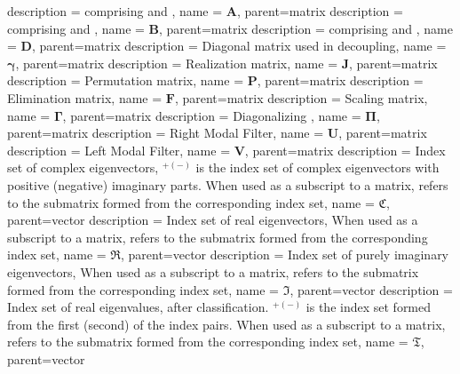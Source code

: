 {
	description = { comprising  and }, 
	name = {\ensuremath{\mathbf{A}}},
	parent=matrix
}
{
	description = { comprising  and }, 
	name = {\ensuremath{\mathbf{B}}},
	parent=matrix
}
{
	description = { comprising  and }, 
	name = {\ensuremath{\mathbf{D}}},
	parent=matrix
}
{
	description = {Diagonal matrix used in decoupling}, 
	name = {\ensuremath{\mathbf{\gamma}}},
	parent=matrix
}
{
	description = {Realization matrix}, 
	name = {\ensuremath{\mathbf{J}}},
	parent=matrix
}
{
	description = {Permutation matrix}, 
	name = {\ensuremath{\mathbf{P}}},
	parent=matrix
}
{
	description = {Elimination matrix}, 
	name = {\ensuremath{\mathbf{F}}},
	parent=matrix
}
{
	description = {Scaling matrix}, 
	name = {\ensuremath{\mathbf{\Gamma}}},
	parent=matrix
}
{
	description = {Diagonalizing }, 
	name = {\ensuremath{\mathbf{\Pi}}},
	parent=matrix
}
{
	description = {Right Modal Filter}, 
	name = {\ensuremath{\mathbf{U}}},
	parent=matrix
}
{
	description = {Left Modal Filter}, 
	name = {\ensuremath{\mathbf{V}}},
	parent=matrix
}
{
	description = {Index set of complex eigenvectors, 
	\ensuremath{^{+(-)}} is the index set of complex eigenvectors with 
	positive (negative) imaginary parts. When used as a subscript to a matrix, refers 
	to the submatrix formed from the corresponding index set}, 
	name = {\ensuremath{\mathfrak{C}}},
	parent=vector
}
{
	description = {Index set of real eigenvectors,
	When used as a subscript to a matrix, refers to the submatrix formed from 
	the corresponding index set}, 
	name = {\ensuremath{\mathfrak{R}}},
	parent=vector
}
{
	description = {Index set of purely imaginary eigenvectors, 
	When used as a subscript to a matrix, refers to the submatrix formed from
	the corresponding index set}, 
	name = {\ensuremath{\mathfrak{I}}},
	parent=vector
}
{
	description = {Index set of real eigenvalues, after classification.
	\ensuremath{^{+(-)}} is the index set formed from the first 
	(second) of the index pairs.
	When used as a subscript to a matrix, refers to the submatrix formed from
	the corresponding index set}, 
	name = {\ensuremath{\mathfrak{T}}},
	parent=vector
}


